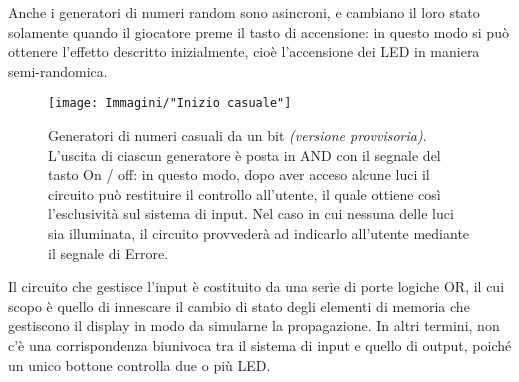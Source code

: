 \documentclass[11pt]{article}
\begin{document}
Anche i generatori di numeri random sono asincroni, e cambiano il loro stato solamente quando il giocatore preme il tasto di accensione: in questo modo si può ottenere l'effetto descritto inizialmente, cioè l'accensione dei LED in maniera semi-randomica.

\begin{figure}[!htpb]
\centering
\texttt{[image: Immagini/"Inizio casuale"]}
\caption{\footnotesize{Generatori di numeri casuali da un bit {\itshape (versione provvisoria)}. L'uscita di ciascun generatore è posta in AND con il segnale del tasto On / off: in questo modo, dopo aver acceso alcune luci il circuito può restituire il controllo all'utente, il quale ottiene così l'esclusività sul sistema di input. Nel caso in cui nessuna delle luci sia illuminata, il circuito provvederà ad indicarlo all'utente mediante il segnale di Errore.}}
\label{fig:iniziocasuale}
\end{figure}

Il circuito che gestisce l'input è costituito da una serie di porte logiche OR, il cui scopo è quello di innescare il cambio di stato degli elementi di memoria che gestiscono il display in modo da simularne la propagazione. In altri termini, non c'è una corrispondenza biunivoca tra il sistema di input e quello di output, poiché un unico bottone controlla due o più LED.
\end{document}
